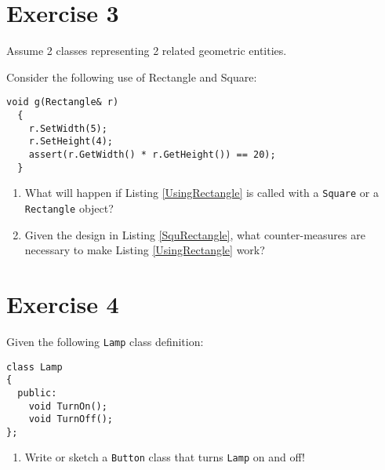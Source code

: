 \documentclass[14pt,a4paper]{article}
\begin{document}
\section*{Exercise 3}
\large
Assume 2 classes representing 2 related geometric entities.
\small
 
\normalsize
Consider the following use of Rectangle and Square:
\small
\begin{lstlisting}[float=h,caption={\large Using Square and Rectangle},label=UsingRectangle]
  void g(Rectangle& r)
  {
    r.SetWidth(5);
    r.SetHeight(4);
    assert(r.GetWidth() * r.GetHeight()) == 20);
  }
  \end{lstlisting}
\normalsize
\begin{enumerate}
\item What will happen if Listing \ref{UsingRectangle} is called with a \texttt{Square} or a \texttt{Rectangle} object?
\item Given the design in Listing \ref{SquRectangle}, what counter-measures are necessary to make Listing \ref{UsingRectangle} work? 
\end{enumerate}

\newpage
\section*{Exercise 4}
Given the following \texttt{Lamp} class definition:
\small
\begin{lstlisting}[float=h,caption={\large A Lamp class},label=Lamp]
class Lamp
{
  public:
    void TurnOn();
    void TurnOff();
};
\end{lstlisting}
\normalsize
\begin{enumerate}
\item Write or sketch a \texttt{Button} class that turns \texttt{Lamp} on and off!
\end{enumerate}
\newpage
\end{document}
